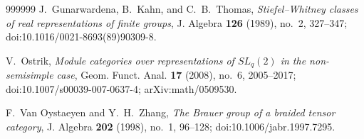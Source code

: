 \documentclass[12pt]{amsart}
\numberwithin{equation}{section}
\theoremstyle{plain}
\theoremstyle{definition}
\theoremstyle{remark}
\begin{document}
\begin{thebibliography}{999999}
 J.~Gunarwardena, B.~Kahn, and C.~B.~Thomas, \emph{Stiefel--Whitney classes of real representations of finite groups}, J. Algebra \textbf{126} (1989), no.~2, 327--347; doi:10.1016/0021-8693(89)90309-8.

 V.~Ostrik, \emph{Module categories over representations of $SL_q(2)$ in the non-semisimple case}, Geom. Funct. Anal. \textbf{17} (2008), no.~6, 2005--2017; doi:10.1007/s00039-007-0637-4; arXiv:math/0509530.

 F.~Van Oystaeyen and Y.~H.~Zhang, \emph{The Brauer group of a braided tensor category}, J. Algebra \textbf{202} (1998), no.~1, 96--128; doi:10.1006/jabr.1997.7295.



\end{thebibliography}
\end{document}
